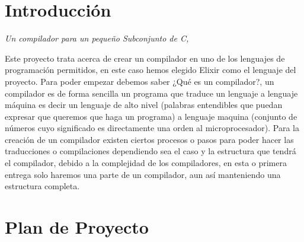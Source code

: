 \documentclass{article}
\begin{document}
\section{Introducción}

\begin{flushright}
\textit{Un compilador para un pequeño Subconjunto de C,}  
\end{flushright}

Este proyecto trata acerca de crear un compilador en uno de los lenguajes de
programación permitidos, en este caso hemos elegido Elixir como el lenguaje
del proyecto. Para poder empezar debemos saber ¿Qué es un compilador?, un
compilador es de forma sencilla un programa que traduce un lenguaje a lenguaje
máquina es decir un lenguaje de alto nivel (palabras entendibles que puedan
expresar que queremos que haga un programa) a lenguaje maquina (conjunto
de números cuyo significado es directamente una orden al microprocesador).
Para la creación de un compilador existen ciertos procesos o pasos para poder
hacer las traducciones o compilaciones dependiendo sea el caso y la estructura
que tendrá el compilador, debido a la complejidad de los compiladores, en esta
o primera entrega solo haremos una parte de un compilador, aun así manteniendo
una estructura completa.

\section{Plan de Proyecto}

\begin{figure}[H]
  \centering
\end{figure}
\begin{figure}[H]
\end{figure}
\end{document}
